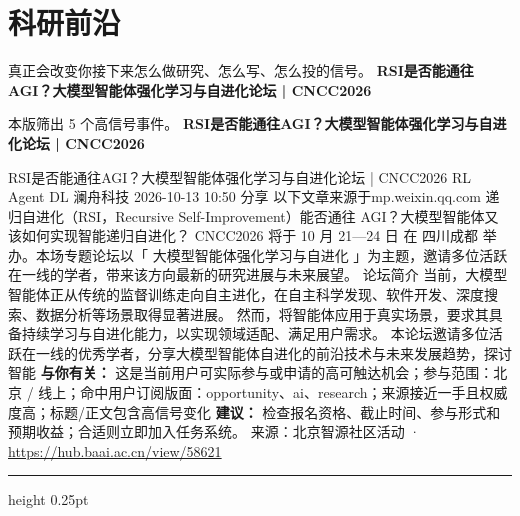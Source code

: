 \documentclass[10.5pt]{ctexart}
\begin{document}
\section*{科研前沿}
{\color{ormuted} 真正会改变你接下来怎么做研究、怎么写、怎么投的信号。}
\vspace{2mm}
{\LARGE\bfseries RSI是否能通往AGI？大模型智能体强化学习与自进化论坛 | CNCC2026}\par
\vspace{1mm}
{\color{ormuted} 本版筛出 5 个高信号事件。}
\vspace{3mm}
{\Large\bfseries RSI是否能通往AGI？大模型智能体强化学习与自进化论坛 | CNCC2026}\par
RSI是否能通往AGI？大模型智能体强化学习与自进化论坛 | CNCC2026 RL Agent DL 澜舟科技 2026-10-13 10:50 分享 以下文章来源于mp.weixin.qq.com 递归自进化（RSI，Recursive Self-Improvement）能否通往 AGI？大模型智能体又该如何实现智能递归自进化？ CNCC2026 将于 10 月 21—24 日 在 四川成都 举办。本场专题论坛以「 大模型智能体强化学习与自进化 」为主题，邀请多位活跃在一线的学者，带来该方向最新的研究进展与未来展望。 论坛简介 当前，大模型智能体正从传统的监督训练走向自主进化，在自主科学发现、软件开发、深度搜索、数据分析等场景取得显著进展。 然而，将智能体应用于真实场景，要求其具备持续学习与自进化能力，以实现领域适配、满足用户需求。 本论坛邀请多位活跃在一线的优秀学者，分享大模型智能体自进化的前沿技术与未来发展趋势，探讨智能
\textbf{与你有关：} 这是当前用户可实际参与或申请的高可触达机会；参与范围：北京 / 线上；命中用户订阅版面：opportunity、ai、research；来源接近一手且权威度高；标题/正文包含高信号变化
\textbf{建议：} 检查报名资格、截止时间、参与形式和预期收益；合适则立即加入任务系统。
{\footnotesize\color{ormuted} 来源：北京智源社区活动 · \url{https://hub.baai.ac.cn/view/58621}}
\vspace{4mm}
\hrule height 0.25pt
\vspace{3mm}
\end{document}
